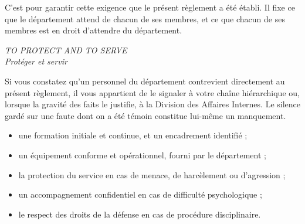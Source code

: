 \vspace{7pt}
C'est pour garantir cette exigence que le présent règlement a été établi. Il fixe ce que le département attend de chacun de ses membres, et ce que chacun de ses membres est en droit d'attendre du département.

\begin{solennel}
\centering\normalsize\itshape
{\lspddisp\fontsize{13}{16}\selectfont\color{lspdnavy}
\upshape{}\MakeUppercase{To Protect and to Serve}}\\[4pt]
\upshape\color{lspdgrey}\small Protéger et servir
\end{solennel}


Si vous constatez qu'un personnel du département contrevient directement au présent règlement, il vous appartient de le signaler à votre chaîne hiérarchique ou, lorsque la gravité des faits le justifie, à la Division des Affaires Internes. Le silence gardé sur une faute dont on a été témoin constitue lui-même un manquement.

\begin{rappel}
\begin{itemize}[leftmargin=6mm,topsep=2pt]
  \item une formation initiale et continue, et un encadrement identifié ;
  \item un équipement conforme et opérationnel, fourni par le département ;
  \item la protection du service en cas de menace, de harcèlement ou d'agression ;
  \item un accompagnement confidentiel en cas de difficulté psychologique ;
  \item le respect des droits de la défense en cas de procédure disciplinaire.
\end{itemize}
\end{rappel}

\clearpage
